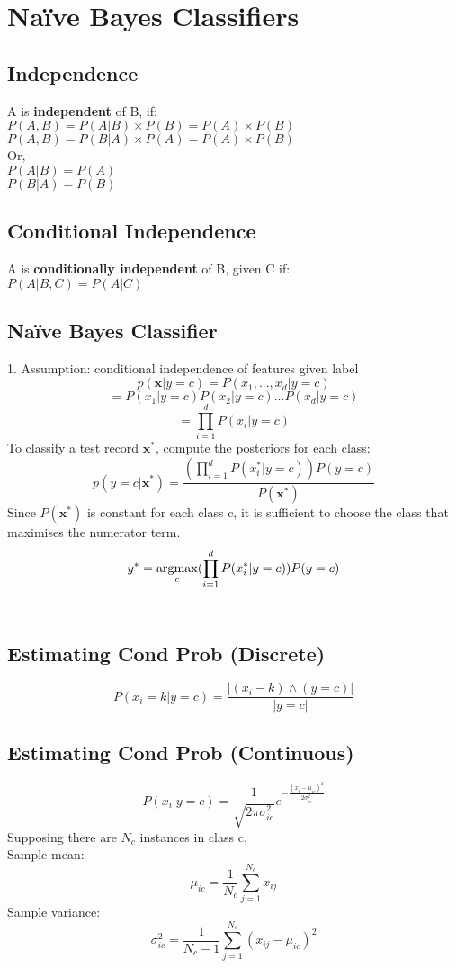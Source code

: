 
\section{Na\"{i}ve Bayes Classifiers}
\subsection*{Independence}
A is \textbf{independent} of B, if:\\
$P(A,B) = P(A|B)\times P(B) = P(A)\times P(B)$\\
$P(A,B) = P(B|A)\times P(A) = P(A)\times P(B)$\\
Or,\\
$P(A|B) = P(A)$\\
$P(B|A) = P(B)$\\
\subsection*{Conditional Independence}
A is \textbf{conditionally independent} of B, given C if:\\
$P(A|B,C) = P(A|C)$\\
\subsection*{Na\"{i}ve Bayes Classifier}
1. Assumption: conditional independence of features given label\\
\[p(\mathbf{x}|y = c) = P(x_1,...,x_d|y=c)\]
\[ = P(x_1|y=c)P(x_2|y=c)...P(x_d|y=c)\]
\[ = \prod^{d}_{i=1}P(x_i|y=c)\]
To classify a test record $\mathbf{x^*}$, compute the posteriors for 
each class:\\
\[p(y=c|\mathbf{x^*}) = \frac{(\prod^{d}_{i=1}P(x_i^*|y=c))P(y=c)}{P(\mathbf{x^*})}\]
Since $P(\mathbf{x^*})$ is constant for each class c, it is sufficient 
to choose the class that maximises the numerator term.
\[y^* = \operatorname*{\arg\!\max}_c (\prod^{d}_{i=1}P(x_i^*|y=c))P(y=c)\]\\

\subsection*{Estimating Cond Prob (Discrete)}
\[P(x_i = k| y = c) = \frac{|(x_i - k)\wedge (y=c)|}{|y=c|}\]
\subsection*{Estimating Cond Prob (Continuous)}
\[P(x_i|y=c) = \frac{1}{\sqrt{2\pi \sigma^2_{ic}}}e^{-\frac{(x_i-\mu_{ic})^2}{2\sigma^2_{ic}}}\]
Supposing there are $N_c$ instances in class c,\\
Sample mean:
\[\mu_{ic} = \frac{1}{N_c}\sum^{N_c}_{j=1}x_{ij}\]
Sample variance:
\[\sigma^2_{ic} = \frac{1}{N_c-1}\sum^{N_c}_{j=1}(x_{ij}-\mu_{ic})^2\]

